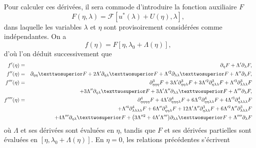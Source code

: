 \documentclass[12pt, final]{amsart}
\begin{document}
Pour calculer ces dérivées, il sera commode d'introduire la fonction auxiliaire
\(F\)
\begin{equation}
  F(\eta , \lambda )=\mathcal{F}[u^*(\lambda )+U(\eta ), \lambda ],
\end{equation}
dans laquelle les variables \(\lambda \) et \(\eta \) sont provisoirement considérées
comme indépendantes. On a
\begin{equation}
  f(\eta )=F[\eta , \lambda _0+\Lambda (\eta )],
\end{equation}
d'où l'on déduit successivement que
\begin{eqnarray}
  \label{eq20211112162417}
  f'(\eta )&=&\partial _\eta F+\Lambda '\partial _\lambda F,\\
  \label{eq20211112165810}
  f''(\eta )&=&\partial _{\eta \eta }²F+2\Lambda '\partial _{\eta \lambda }²F+\Lambda '^2\partial _{\lambda \lambda }²F+\Lambda ''\partial _\lambda  F,\\
  \notag
  f'''(\eta )&=&\partial _{\eta \eta \eta }^3F+3\Lambda '\partial _{\eta \eta \lambda }^3F+3\Lambda '^2\partial _{\eta \lambda \lambda }^3F+\Lambda '^3\partial _{\lambda \lambda \lambda }^3F\\
  \label{eq20211112173223}
       &&+3\Lambda ''\partial _{\eta \lambda }²F+3\Lambda '\Lambda ''\partial _{\lambda \lambda }²F+\Lambda '''\partial _\lambda F,\\
  \notag
  f''''(\eta )&=&\partial _{\eta \eta \eta \eta }^4F+4\Lambda '\partial _{\eta \eta \eta \lambda }^4F+6\Lambda '^2\partial _{\eta \eta \lambda \lambda }^4F+4\Lambda '^3\partial _{\eta \lambda \lambda \lambda }^4F\\
  \notag
       &&+\Lambda '^4\partial _{\lambda \lambda \lambda \lambda }^4F+6\Lambda ''\partial _{\eta \eta \lambda }^3F+12\Lambda '\Lambda ''\partial _{\eta \lambda \lambda }^3F+6\Lambda '^2\Lambda ''\partial _{\lambda \lambda \lambda }^3F\\
       &&+4\Lambda '''\partial _{\eta \lambda }²F+\bigl(3\Lambda ''^2+4\Lambda '\Lambda '''\bigr)\partial _{\lambda \lambda }²F+\Lambda ''''\partial _\lambda F
\end{eqnarray}
où \(\Lambda \) et ses dérivées sont évaluées en \(\eta \), tandis que \(F\) et ses
dérivées partielles sont évaluées en \([\eta , \lambda _0+\Lambda (\eta )]\). En \(\eta =0\), les
relations précédentes s'écrivent
\end{document}

